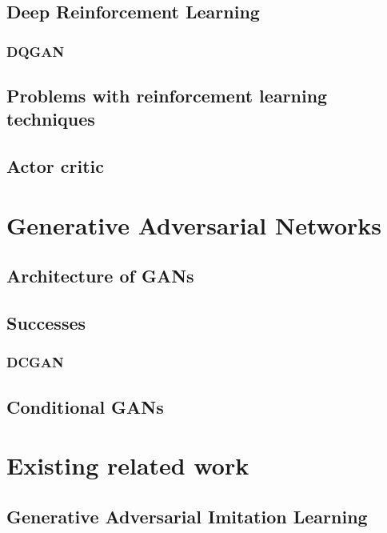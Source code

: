 \subsection{Deep Reinforcement Learning}
\subsubsection{DQGAN}
\subsection{Problems with reinforcement learning techniques}
\subsection{Actor critic}


\section{Generative Adversarial Networks}
\subsection{Architecture of GANs}
\subsection{Successes}
\label{successes}
\subsubsection{DCGAN}
\subsection{Conditional GANs}


\section{Existing related work}
\subsection{Generative Adversarial Imitation Learning}

